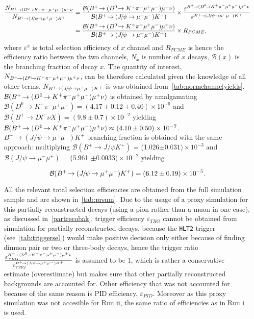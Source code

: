 \begin{equation}
\begin{split}
\frac{N_{\pr}}{N_{\bjpsimumuk}}&= \frac{\mathcal{B}(\pr)}{\mathcal{B}(\bjpsimumuk)} \times \frac{\varepsilon^{\pr}}{\varepsilon^{\bjpsimumuk}} \\
&=\frac{\mathcal{B}(\pr)}{\mathcal{B}(\bjpsimumuk)} \times R_{FCME},
\end{split}
\end{equation}
	where $\varepsilon^{x}$ is total selection efficiency of $x$ channel and $R_{FCME}$ is hence the efficiency ratio between the two channels, $N_{x}$ is number of $x$ decays, $\mathcal{B}(x)$ is the branching fraction of decay $x$. The quantity of interest, $N_{{{{B}^+}}\!\rightarrow ({{D}^0}\!\rightarrow {\ensuremath{{K}^+}}{\ensuremath{{\pi}^-}}{\ensuremath{\mu^+\mu^-}}){\mu^+}\nu}$, can be therefore calculated given the knowledge of all other terms. $N_{{{{B}^+}}\!\rightarrow ({{J\mskip -3mu/\mskip -2mu\psi\mskip 2mu}}\!\rightarrow {\ensuremath{\mu^+\mu^-}}){{K}^+}}$ is was obtained from~\autoref{tab:normchannelyields}. $\mathcal{B}({{{B}^+}}\!\rightarrow ({{D}^0}\!\rightarrow {\ensuremath{{K}^+}}{\ensuremath{{\pi}^-}}{\ensuremath{\mu^+\mu^-}}){\mu^+}\nu)$ is obtained by amalgamating $\mathcal{B}(D^{0} \rightarrow K^+ \pi^- \mu^+ \mu^{-}) = (4.17\pm0.12\pm0.40)\times 10^{-6}$\cite{Aaij:2015hva} and $\mathcal{B}(B^{+} \rightarrow D l^{+} \nu X) = (9.8 \pm 0.7)\times 10^{-2}$ \cite{Patrignani:2016xqp} yielding $\mathcal{B}({{{B}^+}}\!\rightarrow ({{D}^0}\!\rightarrow {\ensuremath{{K}^+}}{\ensuremath{{\pi}^-}}{\ensuremath{\mu^+\mu^-}}){\mu^+}\nu) \approx (4.10\pm0.50)\times 10 ^{-7 }$. $B^+ \rightarrow (J/\psi \rightarrow \mu^+ \mu^{-}) K^{+}$ branching fraction is obtained with the same approach: multiplying $\mathcal{B}(B^{+} \rightarrow J/\psi K^{+})$ = (1.026$\pm 0.031)\times 10^{-3}$\cite{Patrignani:2016xqp} and $\mathcal{B}(J/\psi \rightarrow \mu^{-} \mu^{+})$ = (5.961 $\pm0.0033) \times 10^{-2}$\cite{Patrignani:2016xqp} yielding 
	
\begin{equation}
\mathcal{B}({{{B}^+}}\!\rightarrow ({{J\mskip -3mu/\mskip -2mu\psi\mskip 2mu}}\!\rightarrow {\ensuremath{\mu^+\mu^-}}){{K}^+})=(6.12\pm0.19)\times 10^{-5}.
	\label{eq:normeq}
\end{equation}


All the relevant total selection efficiencies are obtained from the full simulation sample and are shown in~\autoref{tab:prsum}. Due to the usage of a proxy simulation for this partially reconstructed decays (using a pion rather than a muon in one case), as discussed in~\autoref{partrecobak}, trigger efficiency $\varepsilon_{TRG}$ cannot be obtained from simulation for partially reconstructed decays, because the \texttt{HLT2} trigger (see~\autoref{tab:triggersel}) would make positive decision only either because of finding dimuon pair or two or three-body decays, hence the trigger ratio $\frac{\varepsilon^{{{{B}^+}}\!\rightarrow ({{D}^0}\!\rightarrow {\ensuremath{{K}^+}}{\ensuremath{{\pi}^-}}{\ensuremath{\mu^+\mu^-}}){\mu^+}\nu}_{TRG}}{\varepsilon^{{{{B}^+}}\!\rightarrow ({{J\mskip -3mu/\mskip -2mu\psi\mskip 2mu}}\!\rightarrow {\ensuremath{\mu^+\mu^-}}){{K}^+}}_{TRG}}$ 
is assumed to be 1, which is rather a conservative estimate (overestimate) but makes sure that other partially reconstructed backgrounds are accounted for. Other efficiency that was not accounted for because of the same reason is PID efficiency, $\varepsilon_{PID}$.
Moreover as this proxy simulation was not accesible for Run \Rn{2}, the same ratio of efficiencies as in Run \Rn{1} is used.



